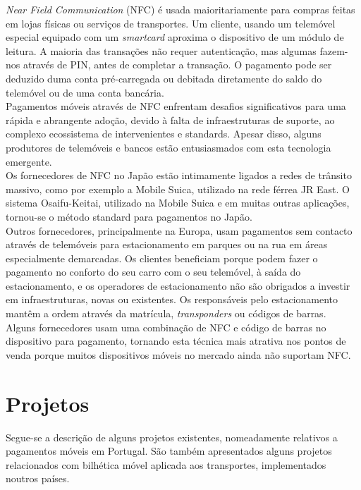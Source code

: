 \textit{Near Field Communication} (NFC) é usada maioritariamente para compras feitas em lojas físicas ou serviços de transportes. Um cliente, usando um telemóvel especial equipado com um \textit{smartcard} aproxima o dispositivo de um módulo de leitura. A maioria das transações não requer autenticação, mas algumas fazem-nos através de PIN, antes de completar a transação. O pagamento pode ser deduzido duma conta pré-carregada ou debitada diretamente do saldo do telemóvel ou de uma conta bancária.\cite{SmartCardAlliance2011}
\\Pagamentos móveis através de NFC enfrentam desafios significativos para uma rápida e abrangente adoção, devido à falta de infraestruturas de suporte, ao complexo ecossistema de intervenientes e standards. Apesar disso, alguns produtores de telemóveis e bancos estão entusiasmados com esta tecnologia emergente.\cite{vdc}
\\Os fornecedores de NFC no Japão estão intimamente ligados a redes de trânsito massivo, como por exemplo a Mobile Suica, utilizado na rede férrea JR East. O sistema Osaifu-Keitai, utilizado na Mobile Suica e em muitas outras aplicações, tornou-se o método standard para pagamentos no Japão.
\\Outros fornecedores, principalmente na Europa, usam pagamentos sem contacto através de telemóveis para estacionamento em parques ou na rua em áreas especialmente demarcadas. Os clientes beneficiam porque podem fazer o pagamento no conforto do seu carro com o seu telemóvel, à saída do estacionamento, e os operadores de estacionamento não são obrigados a investir em infraestruturas, novas ou existentes. Os responsáveis pelo estacionamento mantêm a ordem através da matrícula, \textit{transponders} ou códigos de barras. \cite{pargi}
\\Alguns fornecedores usam uma combinação de NFC e código de barras no dispositivo para pagamento, tornando esta técnica mais atrativa nos pontos de venda porque muitos dispositivos móveis no mercado ainda não suportam NFC.\cite{cimbal}

\section{Projetos} \label{projetos}

Segue-se a descrição de alguns projetos existentes, nomeadamente relativos a pagamentos móveis em Portugal. São também apresentados alguns projetos relacionados com bilhética móvel aplicada aos transportes, implementados noutros países.

